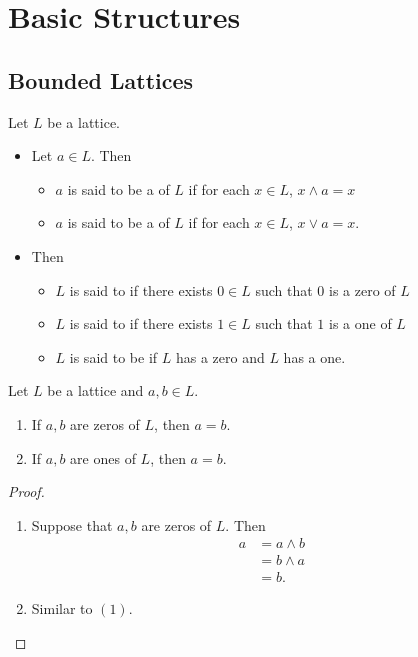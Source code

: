\documentclass{book}
\begin{document}
	
	\newpage
	\section{Basic Structures}
	
	\subsection{Bounded Lattices}
	
	\begin{defn}
		Let $L$ be a lattice. 
		\begin{itemize}
			\item Let $a \in L$. Then 
			\begin{itemize}
				\item $a$ is said to be a  of $L$ if for each $x \in L$, $x \wedge a = x$
				\item $a$ is said to be a  of $L$ if for each $x \in L$, $x \vee a = x$.
			\end{itemize}
			\item Then 
			\begin{itemize}
				\item $L$ is said to  if there exists $0 \in L$ such that $0$ is a zero of $L$
				\item $L$ is said to  if there exists $1 \in L$ such that $1$ is a one of $L$
				\item $L$ is said to be  if $L$ has a zero and $L$ has a one.
			\end{itemize}
		\end{itemize}
	\end{defn}
	
	\begin{ex}
		Let $L$ be a lattice and $a,b \in L$. 
		\begin{enumerate}
			\item If $a,b$ are zeros of $L$, then $a = b$.
			\item If $a,b$ are ones of $L$, then $a = b$.
		\end{enumerate}
	\end{ex}
	
	\begin{proof}\
		\begin{enumerate}
			\item Suppose that $a,b$ are zeros of $L$. Then 
			\begin{align*}
				a
				& = a \wedge b \\
				& = b \wedge a \\
				& = b. 
			\end{align*}
			\item Similar to $(1)$. 
		\end{enumerate}
	\end{proof}
	
\end{document}
